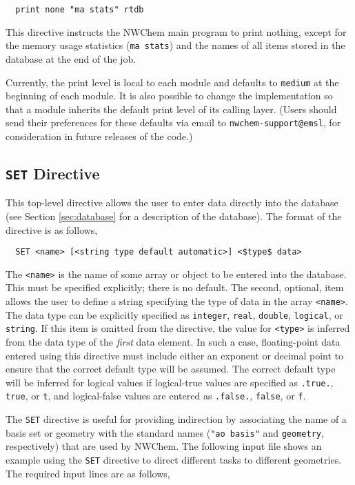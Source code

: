 \begin{verbatim}
  print none "ma stats" rtdb
\end{verbatim}

This directive instructs the NWChem main program to print nothing,
except for the memory usage statistics (\verb+ma stats+) and
the names of all items stored in the database at the end of the job.

Currently, the print level is local to each module and defaults to
{\tt medium} at the beginning of each module.  It is also possible to change
the implementation so that a module inherits the default print level
of its calling layer.  (Users should send their preferences for these
defaults via email to \verb+nwchem-support@emsl+, for consideration in
future releases of the code.)

\subsection{{\tt SET} Directive}
\label{sec:set}

This top-level directive allows the user to enter data directly into the
database (see Section \ref{sec:database} for a description of the database).
The format of the directive is as follows,

\begin{verbatim}
  SET <name> [<string type default automatic>] <$type$ data>
\end{verbatim}

The \verb+<name>+ is the name of some array or object to be entered
into the database.  This must be specified explicitly; there is no
default.  The second, optional, item allows the user to define a string
specifying the type of data in the array \verb+<name>+.  The data type
can be explicitly specified as \verb+integer+, \verb+real+,
\verb+double+, \verb+logical+, or \verb+string+.  If this item is
omitted from the directive, the value for \verb+<type>+ is inferred from
the data type of the {\em first} data element.  In such a case,
floating-point data entered using this directive must include either
an exponent or decimal point to ensure that the correct default type
will be assumed.  The correct default type will be inferred for
logical values if logical-true values are specified as \verb+.true.+,
\verb+true+, or \verb+t+, and logical-false values are entered as
\verb+.false.+, \verb+false+, or \verb+f+.

The \verb+SET+ directive is useful for providing indirection by 
associating the name of a basis set or geometry with the standard
names (\verb+"ao basis"+ and \verb+geometry+, respectively) that are used
by NWChem.  The following input file shows an example using 
the \verb+SET+ directive to direct different tasks to different geometries.
The required input lines are as follows,

